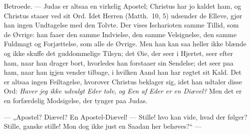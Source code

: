 \documentclass[12pt,a4paper]{book}
\begin{document}
Betroede. --- Judas er altsaa en virkelig Apostel; Christus har jo kaldet ham, og Christus
staaer ved sit Ord. Idet Herren (Matth.\ 10, 5) udsender de Elleve, gjør han ingen Undtagelse
med den
Tolvte. Der vises Ischarioten samme Tillid, som de Øvrige: han faaer den samme Indvielse, den
samme Velsignelse, den samme Fuldmagt og Forjættelse, som alle de Øvrige. Men han kan saa
heller ikke blænde og ikke skuffe det guddommelige Tilsyn; det Øie, der seer i Hjertet, seer
efter ham, naar han drager bort, hvorledes han forstaaer sin Sendelse; det seer paa ham, naar
han igjen vender tilbage, i hvilken Aand han har røgtet sit Kald. Det er altsaa ingen
Feiltagelse, hvorover Christus beklager sig, idet han udtaler disse Ord: \emph{Haver jeg ikke
udvalgt Eder tolv, og Een af Eder er en Diævel?} Men det er en forfærdelig Modsigelse, der
tynger paa Judas.

--- „Apostel? Diævel? En Apostel-Diævel! --- Stille! hvo kan vide, hvad der følger? Stille,
ganske stille! Mon dog ikke just en Saadan her behøves?“ ---
\end{document}
